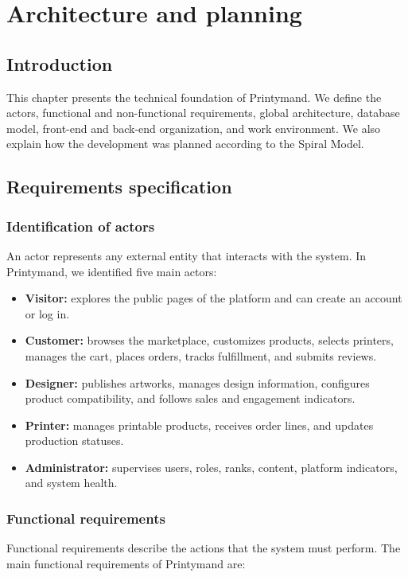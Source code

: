 \chapter{Architecture and planning}
\label{ch::chapter3}

\section{Introduction}
This chapter presents the technical foundation of Printymand.
We define the actors, functional and non-functional requirements, global architecture, database model, front-end and back-end organization, and work environment.
We also explain how the development was planned according to the Spiral Model.

\section{Requirements specification}
\subsection{Identification of actors}
An actor represents any external entity that interacts with the system.
In Printymand, we identified five main actors:

\begin{itemize}
    \item \textbf{Visitor:} explores the public pages of the platform and can create an account or log in.
    \item \textbf{Customer:} browses the marketplace, customizes products, selects printers, manages the cart, places orders, tracks fulfillment, and submits reviews.
    \item \textbf{Designer:} publishes artworks, manages design information, configures product compatibility, and follows sales and engagement indicators.
    \item \textbf{Printer:} manages printable products, receives order lines, and updates production statuses.
    \item \textbf{Administrator:} supervises users, roles, ranks, content, platform indicators, and system health.
\end{itemize}

\subsection{Functional requirements}
Functional requirements describe the actions that the system must perform. The main functional requirements of Printymand are:

